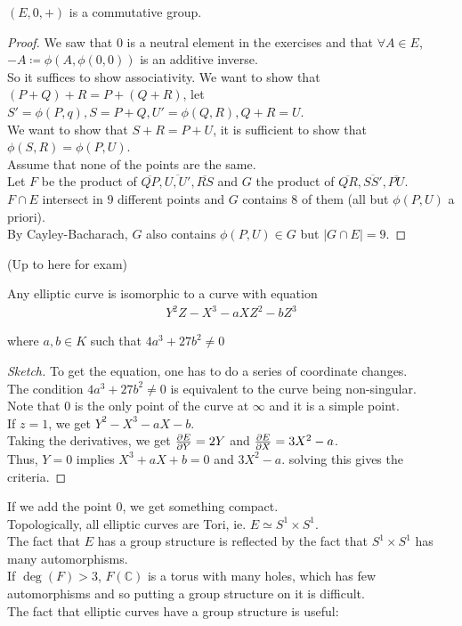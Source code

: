 \documentclass[../main.tex]{subfiles}
\begin{document}
\begin{thm}
	$( E,0,+) $ is a commutative group.
\end{thm}
\begin{proof}
We saw that $0$ is a neutral element in the exercises and that $\forall A \in E$, $-A \coloneqq \phi( A,\phi( 0,0) ) $ is an additive inverse.\\
So it suffices to show associativity.
We want to show that $( P+Q) +R = P+ ( Q+R) $, let $S'= \phi( P,q) , S= P+Q, U'= \phi( Q,R) , Q+R=U$.\\
We want to show that $S+R = P+U$, it is sufficient to show that $\phi( S,R) = \phi( P,U) $.\\
Assume that none of the points are the same.\\
Let $F$ be the product of $ \overline{QP}, \overline{U,U'}, \overline{RS} $ and $G$ the product of $ \overline{QR}, \overline{SS'}, \overline{PU}$.\\
$F\cap E$ intersect in $9$ different points and $G$ contains 8 of them (all but $\phi( P,U) $ a priori).\\
By Cayley-Bacharach, $G$ also contains $\phi( P,U) \in G$ but $|G\cap E|=9$.
\end{proof}
(Up to here for exam) 
\begin{lemma}
Any elliptic curve is isomorphic to a curve with equation
\begin{align*}
Y^{2}Z-X^{3} - aX Z^{2} - b Z^{3}
\end{align*}

where $a,b\in K$ such that $4a^{3}+27b^{2}\neq 0$ 
\end{lemma}
\begin{proof}[Sketch]
To get the equation, one has to do a series of coordinate changes.\\
The condition $4a^{3}+27b^{2}\neq 0$ is equivalent to the curve being non-singular.\\
Note that $0$ is the only point of the curve at $ \infty $ and it is a simple point.\\
If $z=1$, we get $Y^{2}-X^{3}-aX-b$.\\
Taking the derivatives, we get $ \frac{\partial E}{\partial Y}= 2Y$ and $ \frac{\partial E}{\partial X}= 3X^{2}-a$.\\
Thus, $Y=0$ implies $X^{3}+aX+b =0$ and $3X^{2}-a$. solving this gives the criteria.
\end{proof}
If we add the point $0$, we get something compact.\\
Topologically, all elliptic curves are Tori, ie. $E\simeq S^{1}\times S^{1}$.\\
The fact that $E$ has a group structure is reflected by the fact that $S^{1}\times S^{1}$ has many automorphisms.\\
If $\deg ( F) >3$, $F( \mathbb{C}) $ is a torus with many holes, which has few automorphisms and so putting a group structure on it is difficult.\\
The fact that elliptic curves have a group structure is useful:
\end{document}
